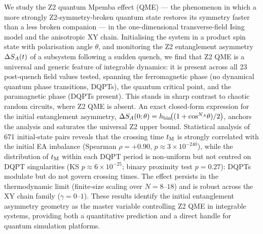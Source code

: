 
We study the Z2 quantum Mpemba effect (QME) — the phenomenon in which a more strongly
Z2-symmetry-broken quantum state restores its symmetry faster than a less broken companion —
in the one-dimensional transverse-field Ising model and the anisotropic XY chain.
Initialising the system in a product spin state with polarisation angle $\theta$, and
monitoring the Z2 entanglement asymmetry $\Delta S_A(t)$ of a subsystem following a sudden quench,
we find that Z2 QME is a universal and generic feature of integrable dynamics:
it is present across all 23 post-quench field values tested, spanning the ferromagnetic
phase (no dynamical quantum phase transitions, DQPTs), the quantum critical point, and the
paramagnetic phase (DQPTs present).
This stands in sharp contrast to chaotic random circuits, where Z2 QME is absent.
An exact closed-form expression for the initial entanglement asymmetry,
$\Delta S_A(0;\theta) = h_{\rm bin}\!\bigl((1+\cos^{N_A}\!\theta)/2\bigr)$, anchors the analysis
and saturates the universal Z2 upper bound.
Statistical analysis of 671 initial-state pairs reveals that the crossing time $t_{\rm M}$
is strongly correlated with the initial EA imbalance (Spearman $\rho = +0.90$,
$p \approx 3 \times 10^{-240}$), while the distribution of $t_{\rm M}$ within each DQPT period
is non-uniform but not centred on DQPT singularities (KS $p \approx 6 \times 10^{-25}$;
binary proximity test $p = 0.27$): DQPTs modulate but do not govern crossing times.
The effect persists in the thermodynamic limit (finite-size scaling over $N = 8$--$18$)
and is robust across the XY chain family ($\gamma = 0$--$1$).
These results identify the initial entanglement asymmetry geometry as the
master variable controlling Z2 QME in integrable systems, providing both a quantitative
prediction and a direct handle for quantum simulation platforms.
